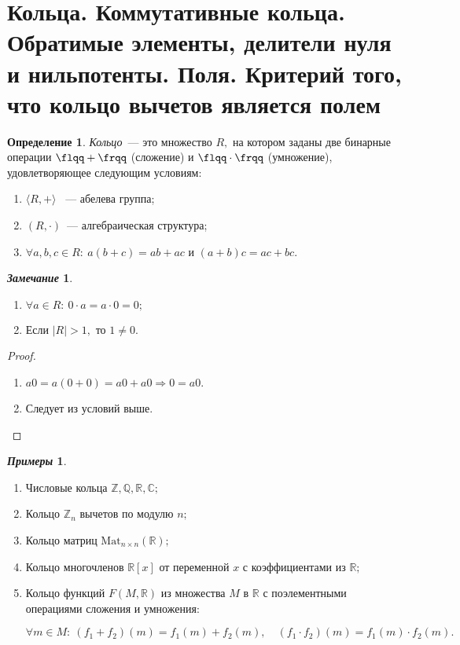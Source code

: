 \documentclass[a4paper, 14pt]{extarticle}
\newcommand{\n}{\par}
\newcommand{\integers}{\mathbb{Z}}
\newcommand{\rationals}{\mathbb{Q}}
\newcommand{\real}{\mathbb{R}}
\newcommand{\complex}{\mathbb{C}}
\newcommand{\suchthat}{{:}{-} \ }
\theoremstyle{definition}
\newtheorem*{exmpls}{\textit{Примеры}}
\newtheorem*{remark}{\textit{Замечание}}
\newtheorem{definition}{Определение}
\theoremstyle{plain}
\numberwithin{theorem}{section}
\numberwithin{definition}{section}
\numberwithin{statement}{section}
\numberwithin{lemma}{section}
\numberwithin{consequence}{section}
\begin{document}
	\section{Кольца. Коммутативные кольца. Обратимые элементы, делители нуля и нильпотенты. Поля. Критерий того, что кольцо вычетов является полем}
		\setcounter{definition}{0}
		\begin{definition}
			\textit{Кольцо}~--- это множество $R,$ на котором заданы две бинарные операции ${\flqq+\frqq}$ (сложение) и ${\flqq \cdot \frqq}$ (умножение), удовлетворяющее следующим условиям:
			\begin{enumerate}
				\setlength\itemsep{0.1em}
				\item $\langle R, + \rangle$ ~--- абелева группа;
				\item $(R, \cdot)$~--- алгебраическая структура;
				\item $\forall a, b, c \in R{:} \ a(b + c) = ab + ac$ и $(a + b)c = ac + bc.$
			\end{enumerate} 
		\end{definition}
		\begin{remark}
			\
			\begin{enumerate}
				\setlength\itemsep{0.1em}
				\item $\forall a \in R{:} \ 0 \cdot a = a \cdot 0 = 0;$
				\item Если $|R| > 1,$ то $1 \neq 0.$ 
			\end{enumerate}
		\end{remark}
		\begin{proof}
			\
			\begin{enumerate}
				\setlength\itemsep{0.1em}
				\item $a0 = a(0 + 0) = a0 + a0 \Longrightarrow 0 = a0.$
				\item Следует из условий выше. \qedhere
			\end{enumerate}
		\end{proof}
		\begin{exmpls}
			\
			\begin{enumerate}
				\setlength\itemsep{0.1em}
				\item Числовые кольца $\integers, \rationals, \real, \complex;$
				\item Кольцо $\integers_n$ вычетов по модулю $n;$
				\item Кольцо матриц $\mathrm{Mat}_{n \times n}(\real);$
				\item Кольцо многочленов $\real[x]$ от переменной $x$ с коэффициентами из $\real;$
				\item Кольцо функций $F(M, \real)$ из множества $M$ в $\real$ с поэлементными
				операциями сложения и умножения: \n
				$\forall m \in M{:} \ (f_1 + f_2)(m) = f_1(m) + f_2(m), \quad (f_1 \cdot f_2)(m) = f_1(m) \cdot f_2(m).$
			\end{enumerate}
		\end{exmpls}
		\newpage
	
\end{document}
